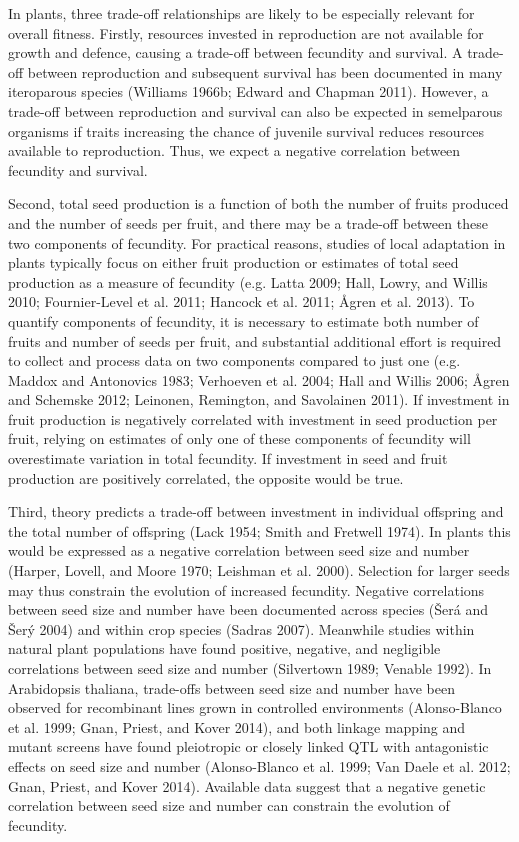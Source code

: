 \documentclass[]{article}
\begin{document}
In plants, three trade-off relationships are likely to be especially relevant for overall fitness. Firstly, resources invested in reproduction are not available for growth and defence, causing a trade-off between fecundity and survival. A trade-off between reproduction and subsequent survival has been documented in many iteroparous species (Williams 1966b; Edward and Chapman 2011). However, a trade-off between reproduction and survival can also be expected in semelparous organisms if traits increasing the chance of juvenile survival reduces resources available to reproduction. Thus, we expect a negative correlation between fecundity and survival.

Second, total seed production is a function of both the number of fruits produced and the number of seeds per fruit, and there may be a trade-off between these two components of fecundity. For practical reasons, studies of local adaptation in plants typically focus on either fruit production or estimates of total seed production as a measure of fecundity (e.g. Latta 2009; Hall, Lowry, and Willis 2010; Fournier-Level et al. 2011; Hancock et al. 2011; Ågren et al. 2013). To quantify components of fecundity, it is necessary to estimate both number of fruits and number of seeds per fruit, and substantial additional effort is required to collect and process data on two components compared to just one (e.g. Maddox and Antonovics 1983; Verhoeven et al. 2004; Hall and Willis 2006; Ågren and Schemske 2012; Leinonen, Remington, and Savolainen 2011). If investment in fruit production is negatively correlated with investment in seed production per fruit, relying on estimates of only one of these components of fecundity will overestimate variation in total fecundity. If investment in seed and fruit production are positively correlated, the opposite would be true.

Third, theory predicts a trade-off between investment in individual offspring and the total number of offspring (Lack 1954; Smith and Fretwell 1974). In plants this would be expressed as a negative correlation between seed size and number (Harper, Lovell, and Moore 1970; Leishman et al. 2000). Selection for larger seeds may thus constrain the evolution of increased fecundity. Negative correlations between seed size and number have been documented across species (Šerá and Šerý 2004) and within crop species (Sadras 2007). Meanwhile studies within natural plant populations have found positive, negative, and negligible correlations between seed size and number (Silvertown 1989; Venable 1992). In Arabidopsis thaliana, trade-offs between seed size and number have been observed for recombinant lines grown in controlled environments (Alonso-Blanco et al. 1999; Gnan, Priest, and Kover 2014), and both linkage mapping and mutant screens have found pleiotropic or closely linked QTL with antagonistic effects on seed size and number (Alonso-Blanco et al. 1999; Van Daele et al. 2012; Gnan, Priest, and Kover 2014). Available data suggest that a negative genetic correlation between seed size and number can constrain the evolution of fecundity.
\end{document}
